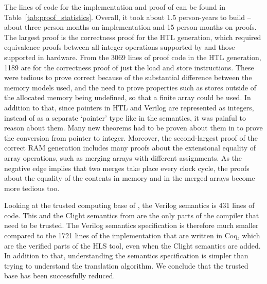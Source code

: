 The lines of code for the implementation and proof of \vericert{} can be found
in Table~\ref{tab:proof_statistics}.  Overall, it took about 1.5 person-years to
build \vericert{} -- about three person-months on implementation and 15
person-months on proofs.  The largest proof is the correctness proof for the HTL
generation, which required equivalence proofs between all integer operations
supported by \compcert{} and those supported in hardware.  From the 3069 lines
of proof code in the HTL generation, 1189 are for the correctness proof of just
the load and store instructions.  These were tedious to prove correct because of
the substantial difference between the memory models used, and the need to prove
properties such as stores outside of the allocated memory being undefined, so
that a finite array could be used. In addition to that, since pointers in HTL
and Verilog are represented as integers, instead of as a separate `pointer' type
like in the \compcert{} semantics, it was painful to reason about them.  Many
new theorems had to be proven about them in \vericert{} to prove the conversion
from pointer to integer.  Moreover, the second-largest proof of the correct RAM
generation includes many proofs about the extensional equality of array
operations, such as merging arrays with different assignments.  As the negative
edge implies that two merges take place every clock cycle, the proofs about the
equality of the contents in memory and in the merged arrays become more tedious
too.

Looking at the trusted computing base of \vericert{}, the Verilog semantics is
431 lines of code.  This and the Clight semantics from \compcert{} are the only
parts of the compiler that need to be trusted.  The Verilog semantics
specification is therefore much smaller compared to the 1721 lines of the
implementation that are written in Coq, which are the verified parts of the HLS
tool, even when the Clight semantics are added.  In addition to that,
understanding the semantics specification is simpler than trying to understand
the translation algorithm. We conclude that the trusted base has been
successfully reduced.

